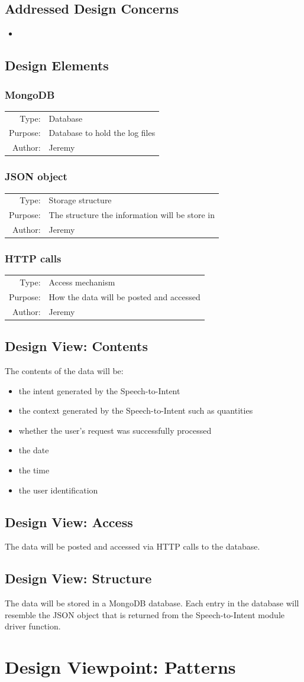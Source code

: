 \documentclass[onecolumn, draftclsnofoot,10pt, compsoc]{IEEEtran}
\newcommand{\designElementDef}[4]{
    \subsubsection{#1}
    \begin{tabular}[t]{r p{6in}}
        Type: & #2 \\
        Purpose: & #3 \\
        Author: & #4 \\
    \end{tabular}
}
\begin{document}
	\subsection{Addressed Design Concerns}
		\begin{itemize}
			\item
		\end{itemize}


	\subsection{Design Elements}
		\designElementDef{MongoDB}{Database}{Database to hold the log files}{Jeremy}
		\designElementDef{JSON object}{Storage structure}{The structure the information will be store in}{Jeremy}
		\designElementDef{HTTP calls}{Access mechanism}{How the data will be posted and accessed}{Jeremy}
	
	\subsection{Design View: Contents}
		The contents of the data will be:
		\begin{itemize}
			\item the intent generated by the Speech-to-Intent
			\item the context generated by the Speech-to-Intent such as quantities
			\item whether the user's request was successfully processed
			\item the date
			\item the time
			\item the user identification
		\end{itemize}
	
	\subsection{Design View: Access}
		The data will be posted and accessed via HTTP calls to the database.
	
	\subsection{Design View: Structure}
		The data will be stored in a MongoDB database.
		Each entry in the database will resemble the JSON object that is returned from the Speech-to-Intent module driver function.
		
		

\section{Design Viewpoint: Patterns}
\end{document}

